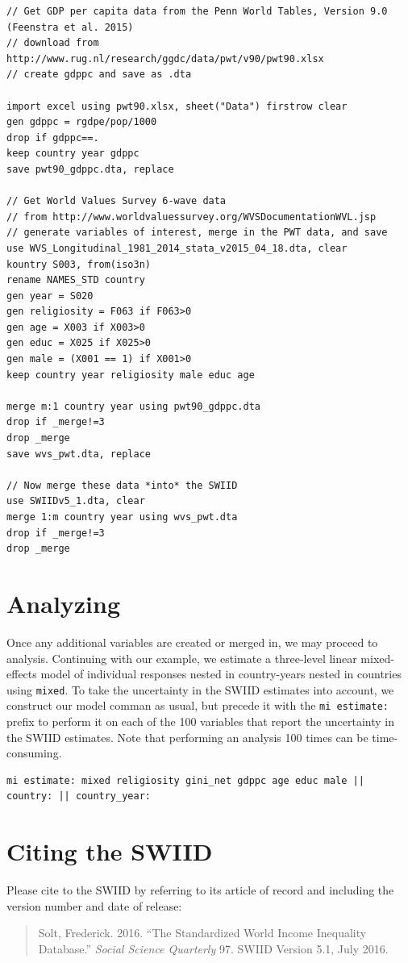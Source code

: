 \documentclass[11pt,]{article}
\theoremstyle{definition}
\theoremstyle{definition}
\theoremstyle{remark}
\begin{document}
\begin{verbatim}
// Get GDP per capita data from the Penn World Tables, Version 9.0 (Feenstra et al. 2015)
// download from http://www.rug.nl/research/ggdc/data/pwt/v90/pwt90.xlsx
// create gdppc and save as .dta

import excel using pwt90.xlsx, sheet("Data") firstrow clear
gen gdppc = rgdpe/pop/1000
drop if gdppc==.
keep country year gdppc
save pwt90_gdppc.dta, replace

// Get World Values Survey 6-wave data 
// from http://www.worldvaluessurvey.org/WVSDocumentationWVL.jsp
// generate variables of interest, merge in the PWT data, and save
use WVS_Longitudinal_1981_2014_stata_v2015_04_18.dta, clear
kountry S003, from(iso3n)
rename NAMES_STD country
gen year = S020
gen religiosity = F063 if F063>0
gen age = X003 if X003>0
gen educ = X025 if X025>0
gen male = (X001 == 1) if X001>0
keep country year religiosity male educ age

merge m:1 country year using pwt90_gdppc.dta
drop if _merge!=3
drop _merge
save wvs_pwt.dta, replace

// Now merge these data *into* the SWIID
use SWIIDv5_1.dta, clear
merge 1:m country year using wvs_pwt.dta
drop if _merge!=3
drop _merge
\end{verbatim}

\section{Analyzing}\label{analyzing}

Once any additional variables are created or merged in, we may proceed
to analysis. Continuing with our example, we estimate a three-level
linear mixed-effects model of individual responses nested in
country-years nested in countries using \texttt{mixed}. To take the
uncertainty in the SWIID estimates into account, we construct our model
comman as usual, but precede it with the \texttt{mi\ estimate:} prefix
to perform it on each of the 100 variables that report the uncertainty
in the SWIID estimates. Note that performing an analysis 100 times can
be time-consuming.

\begin{verbatim}
mi estimate: mixed religiosity gini_net gdppc age educ male || country: || country_year:
\end{verbatim}

\section{Citing the SWIID}\label{citing-the-swiid}

Please cite to the SWIID by referring to its article of record and
including the version number and date of release:

\begin{quote}
Solt, Frederick. 2016. ``The Standardized World Income Inequality
Database.'' \emph{Social Science Quarterly} 97. SWIID Version 5.1, July
2016.
\end{quote}

\newpage
\singlespacing 

\end{document}
